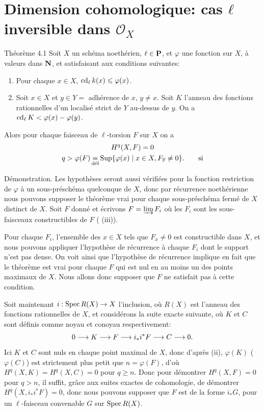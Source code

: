 \documentclass[10pt]{../fichiers-configuration-latex/smfart}
\begin{document}
\section{Dimension cohomologique: cas $ℓ$ inversible dans $𝒪_X$}

\begin{enonce*}{Théorème 4.1}
Soit $X$ un schéma noethérien, $\ell\in \mathbf{P}$, et
$\varphi$ une fonction sur $X$, à valeurs dans
$\mathbf{N}$, et satisfaisant aux conditions suivantes:
\begin{enumerate}
\renewcommand{\theenumi}{\roman{enumi}}
\renewcommand{\labelenumi}{(\theenumi)}
\item Pour chaque $x\in X$, $\operatorname{cd}_{\ell}k(x)\leqslant \varphi (x)$.

\item Soit $x\in X$ et $y\in Y=$ adhérence de $x$, $y\neq x$. Soit $K$
  l'anneau des fonctions rationnelles d'un localisé strict de $Y$
  au-dessus de $y$. On a $\operatorname{cd}_{\ell}K<\varphi(x)-\varphi(y)$.
\end{enumerate}
Alors pour chaque faisceau de $\ell$-torsion $F$ sur $X$ on a
\begin{gather*}
H^q(X,F)=0\\
q>\varphi(F)\mathop{=}_{\text{\rm déf}}\operatorname{Sup}\{\varphi(x)\mid x\in X,
F_{\overline{x}}\neq 0\}{}.\tag*{si}
\end{gather*}
\end{enonce*}

Démonstration.\pageoriginale 
Les hypothèses seront aussi vérifiées pour la fonction
restriction de $\varphi$\sisi{,}{} à un sous-préschéma quelconque de $X$, donc
par récurrence noethérienne nous pouvons supposer le théorème vrai
pour chaque sous-préschéma fermé de $X$ distinct de $X$. Soit $F$
donné et écrivons $F=\varinjlim F_i$ où les $F_i$ sont les
sous-faisceaux constructibles de $F$ ( (iii)).

Pour chaque $F_i$, l'ensemble des $x\in X$ tels que $F_x\neq 0$ est
constructible dans $X$, et nous pouvons appliquer l'hypothèse de
récurrence à chaque $F_i$ dont le support n'est pas dense. On voit
ainsi que l'hypothèse de récurrence implique en fait que le théorème
est vrai pour chaque $F$ qui est nul en au moins un des points
maximaux de $X$. Nous allons donc supposer que $F$ ne satisfait pas à
cette condition.

Soit maintenant $i:\operatorname{Spec} R(X)\rightarrow X$ l'inclusion, où $R(X)$ est
l'anneau des fonctions rationnelles de $X$, et considérons la suite
exacte suivante, où $K$ et $C$ sont définis comme noyau et conoyau
respectivement:
$$
0\longrightarrow K\longrightarrow F\longrightarrow i_{\ast}
i^{\ast}F\longrightarrow C\longrightarrow 0{}.
$$
Ici $K$ et $C$ sont nuls en chaque point maximal de $X$, donc d'après
(ii), $\varphi(K)$ (\resp $\varphi(C)$) est strictement plus petit que
$n=\varphi(F)$, d'où $H^q(X,K)=H^q(X,C)=0$ pour $q\geq n$. Donc\sisi{}{,} pour
démontrer $H^q(X,F)=0$ pour $q>n$, il suffit, grâce aux suites exactes
de cohomologie, de démontrer $H^q(X,i_{\ast}i^{\ast}F)=0$, donc nous
pouvons supposer que $F$ est de la forme $i_{\ast}G$, pour un
$\ell$-faisceau convenable $G$ sur $\operatorname{Spec} R(X)$.
\end{document}
